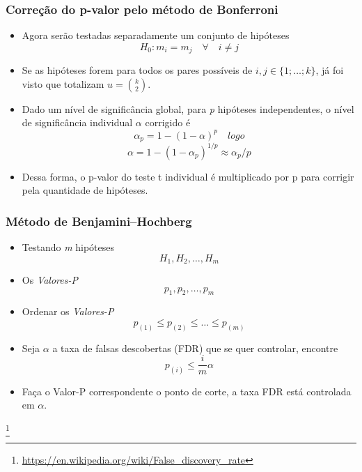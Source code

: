 \documentclass{beamer}
\newcommand\blfootnote[1]{%
  \begingroup
  \renewcommand\thefootnote{}\footnote{#1}%
  \addtocounter{footnote}{-1}%
  \endgroup
}
\begin{document}
\begin{frame}
\frametitle{Correção do p-valor pelo método de Bonferroni}

\begin{itemize}
\item Agora serão testadas separadamente um conjunto de hipóteses
\[H_0: m_i = m_j \quad \forall \quad i \neq j\]
\item Se as hipóteses forem para todos os pares possíveis de \(i, j \in \{1; \ldots; k\}\), já foi visto que totalizam \(u = \binom{k}{2}\).
\item Dado um nível de significância global, para \textit{p} hipóteses independentes, o nível de significância individual \(\alpha\) corrigido é
\[\alpha_p=1-(1-\alpha)^p\quad logo\]
\[\alpha = 1-(1-\alpha_p)^{1/p} \approx \alpha_p/p\]
\item Dessa forma, o p-valor do teste t individual é multiplicado por p para corrigir pela quantidade de hipóteses. 
\end{itemize}

\end{frame}

\begin{frame}
\frametitle{Método de Benjamini–Hochberg}

\begin{itemize}
\item Testando \textit{m} hipóteses
\[H_1, H_2, \ldots, H_m\]
\item Os \textit{Valores-P}
\[p_1, p_2, \ldots, p_m\]
\item Ordenar os \textit{Valores-P}
\[p_{(1)} \leq p_{(2)} \leq \ldots \leq p_{(m)}\]
\item Seja \(\alpha\) a taxa de falsas descobertas (FDR) que se quer controlar, encontre
\[p_{(i)} \leq \frac{i}{m}\alpha\]
\item Faça o Valor-P correspondente o ponto de corte, a taxa FDR está controlada em \(\alpha\). 
\end{itemize}
\blfootnote{\url{https://en.wikipedia.org/wiki/False_discovery_rate}}
\end{frame}
\end{document}
